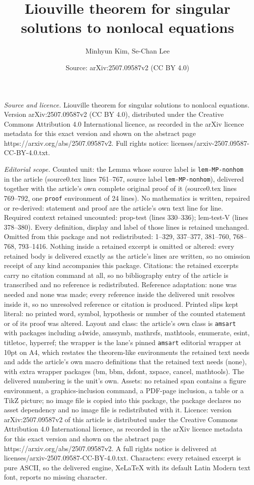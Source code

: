 \documentclass[10pt,a4paper]{amsart}
\title[Liouville theorem for singular solutions to nonlocal equatio]{Liouville theorem for singular solutions to nonlocal equations}
\author{Minhyun Kim, Se-Chan Lee}
\date{Source: arXiv:2507.09587v2 (CC BY 4.0)}
\begin{document}
\maketitle

\noindent\emph{Source and licence.} Liouville theorem for singular solutions to nonlocal equations. Version arXiv:2507.09587v2 (CC BY 4.0), distributed under the Creative Commons Attribution 4.0 International licence, as recorded in the arXiv licence metadata for this exact version and shown on the abstract page https://arxiv.org/abs/2507.09587v2. Full rights notice: licenses/arxiv-2507.09587-CC-BY-4.0.txt.\par\smallskip

\noindent\textit{Editorial scope.} Counted unit: the Lemma whose source label is \texttt{lem-MP-nonhom} in the article (source0.tex lines 761--767, source label \texttt{lem-MP-nonhom}), delivered together with the article's own complete original proof of it (source0.tex lines 769--792, one \texttt{proof} environment of 24 lines). No mathematics is written, repaired or re-derived: statement and proof are the article's own text line for line. Required context retained uncounted: prop-test (lines 330--336); lem-test-V (lines 378--380). Every definition, display and label of those lines is retained unchanged. Omitted from this package and not redistributed: 1--329, 337--377, 381--760, 768--768, 793--1416. Nothing inside a retained excerpt is omitted or altered: every retained body is delivered exactly as the article's lines are written, so no omission receipt of any kind accompanies this package. Citations: the retained excerpts carry no citation command at all, so no bibliography entry of the article is transcribed and no reference is redistributed. Reference adaptation: none was needed and none was made; every reference inside the delivered unit resolves inside it, so no unresolved reference or citation is produced. Printed slips kept literal: no printed word, symbol, hypothesis or number of the counted statement or of its proof was altered. Layout and class: the article's own class is \texttt{amsart} with packages including a4wide, amssymb, mathrsfs, mathtools, enumerate, esint, titletoc, hyperref; the wrapper is the lane's pinned \texttt{amsart} editorial wrapper at 10pt on A4, which restates the theorem-like environments the retained text needs and adds the article's own macro definitions that the retained text needs (none), with extra wrapper packages (bm, bbm, dsfont, xspace, cancel, mathtools). The delivered numbering is the unit's own. Assets: no retained span contains a figure environment, a graphics-inclusion command, a PDF-page inclusion, a table or a TikZ picture; no image file is copied into this package, the package declares no asset dependency and no image file is redistributed with it. Licence: version arXiv:2507.09587v2 of this article is distributed under the Creative Commons Attribution 4.0 International licence, as recorded in the arXiv licence metadata for this exact version and shown on the abstract page https://arxiv.org/abs/2507.09587v2. A full rights notice is delivered at licenses/arxiv-2507.09587-CC-BY-4.0.txt. Characters: every retained excerpt is pure ASCII, so the delivered engine, XeLaTeX with its default Latin Modern text font, reports no missing character.
\end{document}
